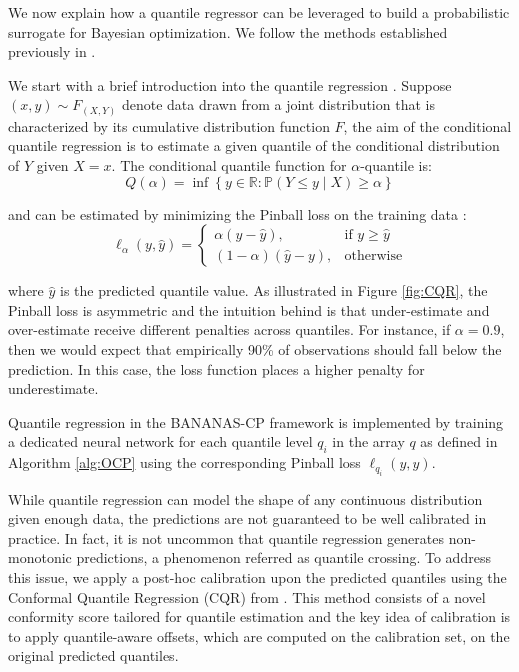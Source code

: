 \documentclass[a4paper,oneside,bibliography=totoc]{scrbook}
\begin{document}
{\begin{description}[leftmargin=0cm]
	\item [Quantile Regressor] We now explain how a quantile regressor can be leveraged to build a probabilistic surrogate for Bayesian optimization. We follow the methods established previously in \cite{romano2019conformalized, salinas2023optimizing}.
	
	
	We start with a brief introduction into the quantile regression \cite{koenker1978regression}. Suppose $(x, y) \sim F_{(X, Y)}$ denote data drawn from a joint distribution that is characterized by its cumulative distribution function $F$, the aim of the conditional quantile regression is to estimate a given quantile of the conditional distribution of $Y$ given $X=x$. The conditional quantile function for $\alpha$-quantile is:
		\begin{equation}
			Q(\alpha) = \inf \left\{ y \in \mathbb{R} : \mathbb{P}(Y \leq y \mid X) \geq \alpha \right\}
		\label{quantilefunc}
		\end{equation}
		
	and can be estimated by minimizing the Pinball loss on the training data \cite{koenker1978regression}:
		\begin{equation}
			\ell_\alpha(y, \hat{y}) = 
			\begin{cases}
			\alpha (y - \hat{y}), & \text{if } y \geq \hat{y} \\
			(1 - \alpha)(\hat{y} - y), & \text{otherwise}
			\end{cases}
		\label{pinballloss}
		\end{equation}
		
	where $\hat{y}$ is the predicted quantile value.	 As illustrated in Figure \ref{fig:CQR}, the Pinball loss is asymmetric and the intuition behind is that under-estimate and over-estimate receive different penalties across quantiles. 	For instance, if $\alpha=0.9$, then we would expect that empirically 90\% of observations should fall below the prediction. In this case, the loss function places a higher penalty for underestimate.	
	
	Quantile regression in the BANANAS-CP framework is implemented by training a dedicated neural network for each quantile level $q_i$ in the array $q$ as defined in Algorithm \ref{alg:OCP} using the corresponding Pinball loss $\ell_{q_i}(y, \hat{y})$.
	
	 While quantile regression can model the shape of any continuous distribution given enough data, the predictions are not guaranteed to be well calibrated in practice. In fact, it is not uncommon that quantile regression generates non-monotonic predictions, a phenomenon referred as quantile crossing. To address this issue, we apply a post-hoc calibration upon the predicted quantiles using the Conformal Quantile Regression (CQR) from \cite{romano2019conformalized}. This method consists of a novel conformity score tailored for quantile estimation and the key idea of calibration is to apply quantile-aware offsets, which are computed on the calibration set, on the original predicted quantiles. 
		 

\end{description}}
\end{document}
